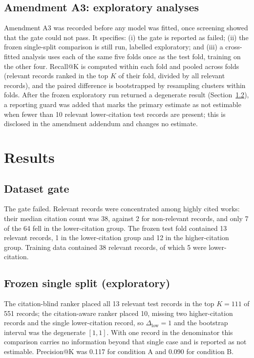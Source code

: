 \documentclass[acmsmall,screen,nonacm]{acmart}
\begin{document}
\subsection{Amendment A3: exploratory analyses}

Amendment A3 was recorded before any model was fitted, once screening showed that the gate could not
pass. It specifies: (i) the gate is reported as failed; (ii) the frozen single-split comparison is still
run, labelled exploratory; and (iii) a cross-fitted analysis uses each of the same five folds once as the
test fold, training on the other four. Recall@K is computed within each fold and pooled across folds
(relevant records ranked in the top $K$ of their fold, divided by all relevant records), and the paired
difference is bootstrapped by resampling clusters within folds. After the frozen exploratory run returned
a degenerate result (Section~\ref{sec:frozen}), a reporting guard was added that marks the primary
estimate as not estimable when fewer than 10 relevant lower-citation test records are present; this is
disclosed in the amendment addendum and changes no estimate.

\section{Results}
\label{sec:results}

\subsection{Dataset gate}

The gate failed. Relevant records were concentrated among highly cited works: their median citation
count was 38, against 2 for non-relevant records, and only 7 of the 64 fell in the lower-citation group.
The frozen test fold contained 13 relevant records, 1 in the lower-citation group and 12 in the
higher-citation group. Training data contained 38 relevant records, of which 5 were lower-citation.

\subsection{Frozen single split (exploratory)}
\label{sec:frozen}

The citation-blind ranker placed all 13 relevant test records in the top $K = 111$ of 551 records; the
citation-aware ranker placed 10, missing two higher-citation records and the single lower-citation record, so $\Delta_{\text{low}} = 1$ and the bootstrap interval was the degenerate $[1, 1]$.
With one record in the denominator this comparison carries no information beyond that single case and is
reported as not estimable. Precision@K was 0.117 for condition A and 0.090 for condition B.
\end{document}
